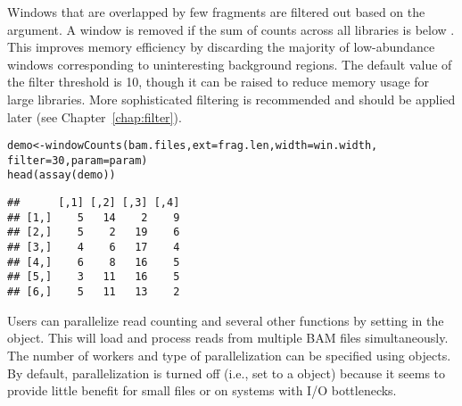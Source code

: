 \documentclass{report}\usepackage[]{graphicx}\usepackage[usenames,dvipsnames]{color}
\newcommand{\hlnum}[1]{\textcolor[rgb]{0.816,0.125,0.439}{#1}}%
\newcommand{\hlopt}[1]{\textcolor[rgb]{0,0,0}{#1}}%
\newcommand{\hlstd}[1]{\textcolor[rgb]{0.251,0.251,0.251}{#1}}%
\newcommand{\hlkwb}[1]{\textcolor[rgb]{0,0,0}{#1}}%
\newcommand{\hlkwc}[1]{\textcolor[rgb]{0.251,0.251,0.251}{#1}}%
\newcommand{\hlkwd}[1]{\textcolor[rgb]{0.878,0.439,0.125}{#1}}%
\newenvironment{knitrout}{}{} %
\begin{document}
Windows that are overlapped by few fragments are filtered out based on the  argument. 
A window is removed if the sum of counts across all libraries is below .
This improves memory efficiency by discarding the majority of low-abundance windows corresponding to uninteresting background regions. 
The default value of the filter threshold is 10, though it can be raised to reduce memory usage for large libraries.
More sophisticated filtering is recommended and should be applied later (see Chapter~\ref{chap:filter}).

\begin{knitrout}
\color{fgcolor}\begin{kframe}
\begin{alltt}
\hlstd{demo} \hlkwb{<-} \hlkwd{windowCounts}\hlstd{(bam.files,} \hlkwc{ext}\hlstd{=frag.len,} \hlkwc{width}\hlstd{=win.width,}
                     \hlkwc{filter}\hlstd{=}\hlnum{30}\hlstd{,} \hlkwc{param}\hlstd{=param)}
\hlkwd{head}\hlstd{(}\hlkwd{assay}\hlstd{(demo))}
\end{alltt}
\begin{verbatim}
##      [,1] [,2] [,3] [,4]
## [1,]    5   14    2    9
## [2,]    5    2   19    6
## [3,]    4    6   17    4
## [4,]    6    8   16    5
## [5,]    3   11   16    5
## [6,]    5   11   13    2
\end{verbatim}
\end{kframe}
\end{knitrout}

Users can parallelize read counting and several other functions by setting  in the  object.
This will load and process reads from multiple BAM files simultaneously.
The number of workers and type of parallelization can be specified using  objects.
By default, parallelization is turned off (i.e., set to a  object) because it seems to provide little benefit for small files or on systems with I/O bottlenecks.

\begin{knitrout}
\color{fgcolor}
\end{knitrout}
\end{document}
